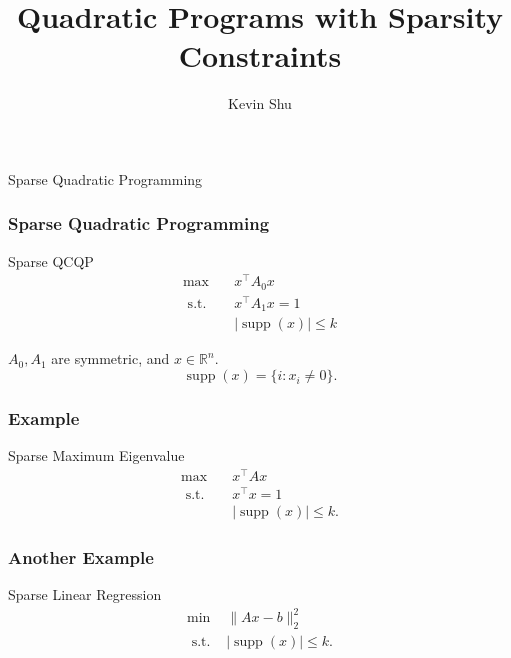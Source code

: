 \documentclass{beamer}
\title{Quadratic Programs with Sparsity Constraints}
\author{Kevin Shu\inst{1}}
\institute{\inst{1} Georgia Institute of Technology}
\date{}
\newcommand{\R}{\mathbb{R}}
\DeclareMathOperator*{\supp}{supp}
\newcommand{\st}{{\text{ s.t. }}}
\begin{document}
\frame{\titlepage}
\begin{frame}
    \centering
    \huge
    {\color{gray}Sparse Quadratic Programming}
\end{frame}
\begin{frame}
\frametitle{Sparse Quadratic Programming}
\begin{block}{Sparse QCQP}
    \begin{equation*}
        \begin{aligned}
            \max\quad & x^{\intercal}A_0x\\
            \st & x^{\intercal}A_1x = 1\\
                &|\supp(x)| \le k
        \end{aligned}
    \end{equation*}
\end{block}

    $A_0, A_1$ are symmetric, and $x \in \R^n$. 
    \[
        \supp(x) = \{i : x_i \neq 0\}.
    \]

\end{frame}
\begin{frame}
    \frametitle{Example}
    \begin{block}{Sparse Maximum Eigenvalue}
        \begin{equation*}
            \begin{aligned}
                \max\quad & x^{\intercal}Ax\\
                \st & x^{\intercal}x = 1\\
                    &|\supp(x)| \le k.
            \end{aligned}
        \end{equation*}
        
    \end{block}
\end{frame}
\begin{frame}
    \frametitle{Another Example}
    \begin{block}{Sparse Linear Regression}
        \begin{equation*}
            \begin{aligned}
            \min & \|Ax - b\|_2^2\\
            \st & |\supp(x)| \le k.
            \end{aligned}
        \end{equation*}
    \end{block}
\end{frame}
\end{document}
